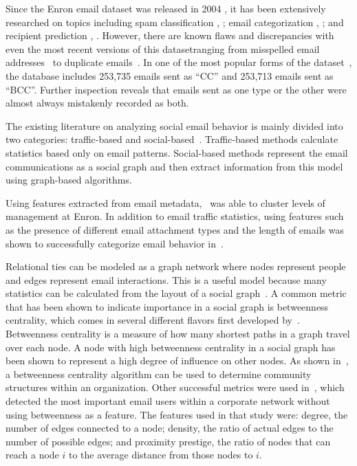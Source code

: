 \documentclass{article}
\begin{document}
Since the Enron email dataset was released in 2004 \cite{klimt_introducing_2004}, it has been extensively researched on topics including spam classification \cite{gaber_e-mail_2016}, \cite{shams_classifying_2013}; email categorization \cite{he_novel_2014}, \cite{keila_structure_2005}; and recipient prediction \cite{sofershtein_predicting_2015}, \cite{hu_towards_2012}.  However, there are known flaws and discrepancies with even the most recent versions of this dataset\textemdash{}ranging from misspelled email addresses~\cite{nordbo_data_2014} to duplicate emails~\cite{waterman_big_2014}. In one of the most popular forms of the dataset~\cite{shetty_enron_2004}, the database includes 253,735 emails sent as ``CC'' and  253,713 emails sent as ``BCC''.  Further inspection reveals that emails sent as one type or the other were almost always mistakenly recorded as both.

The existing literature on analyzing social email behavior is mainly divided into two categories: traffic-based and social-based~\cite{tang_email_2013}.  Traffic-based methods calculate statistics based only on email patterns. Social-based methods represent the email communications as a social graph and then extract information from this model using graph-based algorithms.

Using features extracted from email metadata,~\cite{yelupula_social_2008} was able to cluster levels of management at Enron. In addition to email traffic statistics, using features such as the presence of different email attachment types and the length of emails was shown to successfully categorize email behavior in~\cite{martin_analyzing_2005}.

Relational ties can be modeled as a graph network where nodes represent people and edges represent email interactions.  This is a useful model because many statistics can be calculated from the layout of a social graph~\cite{wasserman_social_1994}.  A common metric that has been shown to indicate importance in a social graph is betweenness centrality, which comes in several different flavors first developed by~\cite{freeman_set_1977}.  Betweenness centrality is a measure of how many shortest paths in a graph travel over each node.  A node with high betweenness centrality in a social graph has been shown to represent a high degree of influence on other nodes.  As shown in~\cite{tyler_email_2003}, a betweenness centrality algorithm can be used to determine community structures within an organization.  Other successful metrics were used in~\cite{wilson_discovery_2009}, which detected the most important email users within a corporate network without using betweenness as a feature.  The features used in that study were: degree, the number of edges connected to a node; density, the ratio of actual edges to the number of possible edges; and proximity prestige, the ratio of nodes that can reach a node $i$ to the average distance from those nodes to $i$.
\end{document}
